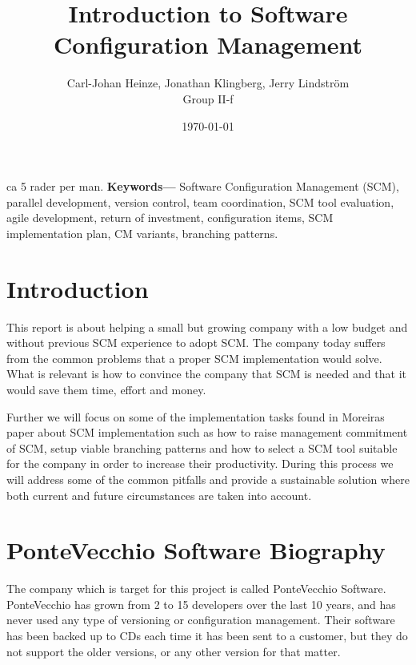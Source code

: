 \documentclass[10pt]{article}
\renewenvironment{abstract}
  {\small\quotation
  {\bfseries\noindent{\large\abstractname}\par\nobreak\smallskip}}
  {\endquotation}
\providecommand{\keywords}[1]{\textbf{{Keywords---}} #1}
\begin{document}
\makeatletter
\renewcommand{\@biblabel}[1]{\quad#1.}
\makeatother


\pagestyle{myheadings}


\begin{titlepage}
\title{Introduction to Software Configuration Management}
\author{Carl-Johan Heinze, Jonathan Klingberg, Jerry Lindström \\Group II-f}
\date{\today}
\maketitle
\thispagestyle{empty}
\end{titlepage}

\tableofcontents
\thispagestyle{empty}
\newpage
{}

\begin{abstract}
ca 5 rader per man.
\end{abstract}
\keywords{Software Configuration Management (SCM), parallel development, version control, team coordination, SCM tool evaluation, agile development, return of investment, configuration items, SCM implementation plan, CM variants, branching patterns.}

\section{Introduction}
This report is about helping a small but growing company with a low budget and without previous SCM experience to adopt SCM. The company today suffers from the common problems that a proper SCM implementation would solve. What is relevant is how to convince the company that SCM is needed and that it would save them time, effort and money. 

\noindent Further we will focus on some of the implementation tasks found in Moreiras \cite{Moreira} paper about SCM implementation such as how to raise management commitment of SCM, setup viable branching patterns and how to select a SCM tool suitable for the company in order to increase their productivity. During this process we will address some of the common pitfalls and provide a sustainable solution where both current and future circumstances are taken into account.

\section{PonteVecchio Software Biography}
The company which is target for this project is called PonteVecchio Software. PonteVecchio has grown from 2 to 15 developers over the last 10 years, and has never used any type of versioning or configuration management. Their software has been backed up to CDs each time it has been sent to a customer, but they do not support the older versions, or any other version for that matter.
\end{document}
